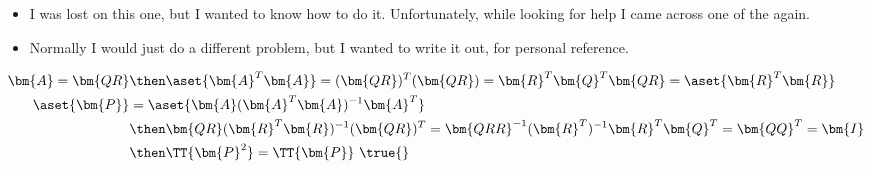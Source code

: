 \begin{itemize}
\begin{enumerate}
    \begin{itemize}
      \item I was lost on this one, but I wanted to know how to do it.
        Unfortunately, while looking for help I came across one of
        the  again.
      \item Normally I would just do a different problem, but I wanted to write
        it out, for personal reference.
    \end{itemize}
    \begin{align*}
      \bm{A} = \bm{QR} &\then \aset{\bm{A}^T  \bm{A}} = (\bm{QR})^T (\bm{QR}) = \bm{R}^T \bm{Q}^T \bm{QR} = \aset{\bm{R}^T \bm{R}} \\
      \aset{\bm{P}} &= \aset{\bm{A}(\bm{A}^T \bm{A})^{-1} \bm{A}^T } \\
             &\then
             \bm{QR}(\bm{R}^T \bm{R})^{-1} (\bm{QR})^T = \bm{QRR}^{-1}(\bm{R}^T )^{-1} \bm{R}^T \bm{Q}^T = \bm{QQ}^T = \bm{I} \\
             &\then \TT{\bm{P}^2} = \TT{\bm{P}}~\text{\true{}}
    \end{align*}

  \end{enumerate}
\end{itemize}

